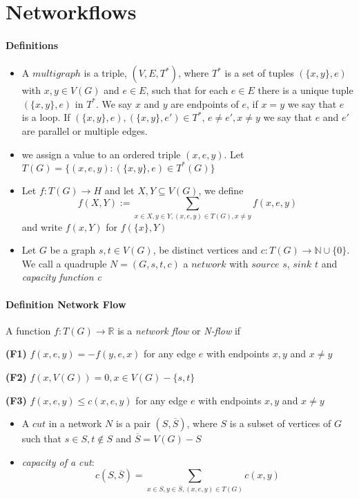 \section{Networkflows}

\paragraph{Definitions}
\begin{itemize}
    \item A $multigraph$ is a triple, $(V,E,T^*)$, where $T^*$ is a set of 
    tuples $(\{x,y\},e)$ with $x,y \in V(G)$ and $e \in E$, such that for each
    $e \in E$ there is a unique tuple $(\{x,y\},e)$ in $T^*$. We say $x$ and 
    $y$ are endpoints of $e$, if $x=y$ we say that $e$ is a loop.
    If $(\{x,y\},e), (\{x,y\},e') \in T^*$, $e \neq e', x \neq y$ we say 
    that $e$ and $e'$ are parallel or multiple edges.

    \item we assign a value to an ordered triple $(x,e,y)$. Let 
    $T(G) = \{(x,e,y): (\{x,y\},e) \in T^*(G)\}$
    
    \item Let $f: T(G) \to H$ and let $X,Y \subseteq V(G)$, we define 
    $$ f(X,Y) := \sum_{x\in X, y\in Y, (x,e,y)\in T(G), x\neq y} f(x,e,y)$$
    and write $f(x,Y)$ for $f(\{x\}, Y)$

    \item Let $G$ be a graph $s,t \in V(G)$, be distinct vertices and  
    $c: T(G) \to \mathbb{N} \cup \{0\}$. We call a quadruple $N = (G,s,t,c)$
    a $network$ with $source$ $s$, $sink$ $t$ and \textit{capacity function c}
\end{itemize}



\paragraph{Definition Network Flow} 
A function $f : T(G) \to \mathbb{R}$ is a \textit{network flow} or 
\textit{N-flow} if 

\smallskip \noindent
\textbf{(F1)} $f(x,e,y) = - f(y,e,x)$ for any edge $e$ with endpoints $x,y$
and $x \neq y$

\smallskip \noindent
\textbf{(F2)} $f(x,V(G)) = 0, x \in V(G) - \{s,t\}$ 

\smallskip \noindent
\textbf{(F3)} $f(x,e,y) \leq c(x,e,y)$ for any edge $e$ with endpoints $x,y$
and $x \neq y$


\begin{itemize}
    \item A $cut$ in a network $N$ is a pair $(S,\overline{S})$, where $S$
    is a subset of vertices of $G$ such that $s \in S, t \notin S$ and 
    $\overline{S} = V(G) - S$

    \item \textit{capacity of a cut}:
    $$ c(S,\overline{S}) = \sum_{x\in S, y \in \overline{S}, (x,e,y) \in T(G)}
    c(x,y) $$
\end{itemize}

